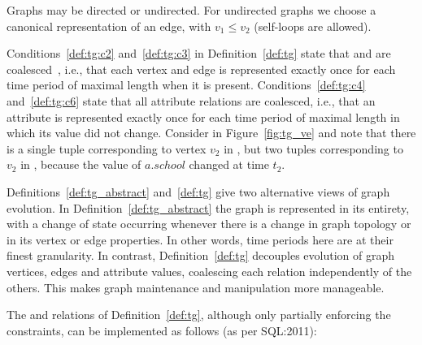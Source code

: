 
Graphs may be directed or undirected.  For undirected graphs we choose
a canonical representation of an edge, with $v_1 \leq v_2$ (self-loops
are allowed).

Conditions~\ref{def:tg:c2} and~\ref{def:tg:c3} in
Definition~\ref{def:tg} state that \tv and \te are
coalesced~\cite{DBLP:conf/vldb/BohlenSS96}, i.e., that each vertex and
edge is represented exactly once for each time period of maximal
length when it is present.  Conditions~\ref{def:tg:c4}
and~\ref{def:tg:c6} state that all attribute relations are coalesced,
i.e., that an attribute is represented exactly once for each time
period of maximal length in which its value did not change.  Consider
 in Figure~\ref{fig:tg_ve} and note that there is a single
tuple corresponding to vertex $v_2$ in \tv, but two tuples
corresponding to $v_2$ in \tav, because the value of $a.school$
changed at time $t_2$.

Definitions~\ref{def:tg_abstract} and~\ref{def:tg} give two
alternative views of graph evolution.  In
Definition~\ref{def:tg_abstract} the graph is represented in its
entirety, with a change of state occurring whenever there is a change
in graph topology or in its vertex or edge properties.  In other
words, time periods here are at their finest granularity.  In
contrast, Definition~\ref{def:tg} decouples evolution of graph
vertices, edges and attribute values, coalescing each relation
independently of the others.  This makes graph maintenance and
manipulation more manageable.

The \tv and \te relations of Definition~\ref{def:tg}, although only
partially enforcing the constraints, can be implemented as follows (as
per SQL:2011):


